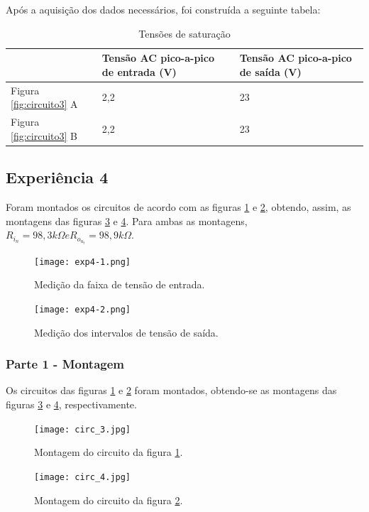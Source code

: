 \documentclass{abntex2}
\begin{document}
Após a aquisição dos dados necessários, foi construída a seguinte tabela:

\begin{table}[h!]
\centering
\begin{tabular}{|l|l|l|}
  \hline
   & Tensão AC pico-a-pico de entrada (V) & Tensão AC pico-a-pico de saída (V) \\
  \hline
  Figura \ref{fig:circuito3} A & 2,2 & 23 \\
  \hline
  Figura \ref{fig:circuito3} B & 2,2 & 23 \\
  \hline
\end{tabular}
\caption{Tensões de saturação}
\label{tab:exp3}
\end{table}


\subsection{Experiência 4}

Foram montados os circuitos de acordo com as figuras \ref{fig:circuito4} e \ref{fig:circuito5}, obtendo, assim, as montagens das figuras \ref{fig:montagem5} e \ref{fig:montagem6}.
Para ambas as montagens, $R_i_n = 98,3k\Omega e R_o_u_t = 98,9k\Omega$.
\begin{figure}[h]
  \centering
  \texttt{[image: exp4-1.png]}
  \caption{Medição da faixa de tensão de entrada.}
  \label{fig:circuito4}
\end{figure}
\begin{figure}[h]
  \centering
  \texttt{[image: exp4-2.png]}
  \caption{Medição dos intervalos de tensão de saída.}
  \label{fig:circuito5}
\end{figure}

\subsubsection{Parte 1 - Montagem}

Os circuitos das figuras \ref{fig:circuito4} e \ref{fig:circuito5} foram montados, obtendo-se as montagens das figuras \ref{fig:montagem5} e \ref{fig:montagem6}, respectivamente.

\begin{figure}[h]
  \centering
  \texttt{[image: circ\_3.jpg]}
  \caption{Montagem do circuito da figura \ref{fig:circuito4}.}
  \label{fig:montagem5}
\end{figure}
\begin{figure}[h]
  \centering
  \texttt{[image: circ\_4.jpg]}
  \caption{Montagem do circuito da figura \ref{fig:circuito5}.}
  \label{fig:montagem6}
\end{figure}
\end{document}
